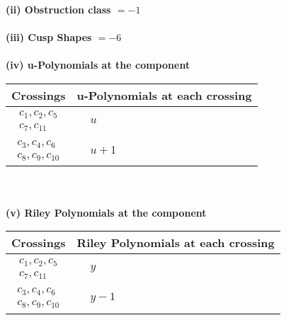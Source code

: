 \documentclass[1p]{elsarticle_modified}
\theoremstyle{definition}
\begin{document}
\flushleft \textbf{(ii) Obstruction class $= -1$}\\~\\
\flushleft \textbf{(iii) Cusp Shapes $= -6$}\\~\\
\newpage\renewcommand{\arraystretch}{1}
\flushleft \textbf{(iv) u-Polynomials at the component}\newline \\
\begin{tabular}{m{50pt}|m{274pt}}
Crossings & \hspace{64pt}u-Polynomials at each crossing \\
\hline $$\begin{aligned}c_{1},c_{2},c_{5}\\c_{7},c_{11}\end{aligned}$$&$\begin{aligned}
&u
\end{aligned}$\\
\hline $$\begin{aligned}c_{3},c_{4},c_{6}\\c_{8},c_{9},c_{10}\end{aligned}$$&$\begin{aligned}
&u+1
\end{aligned}$\\
\hline
\end{tabular}\\~\\
\newpage\renewcommand{\arraystretch}{1}
\flushleft \textbf{(v) Riley Polynomials at the component}\newline \\
\begin{tabular}{m{50pt}|m{274pt}}
Crossings & \hspace{64pt}Riley Polynomials at each crossing \\
\hline $$\begin{aligned}c_{1},c_{2},c_{5}\\c_{7},c_{11}\end{aligned}$$&$\begin{aligned}
&y
\end{aligned}$\\
\hline $$\begin{aligned}c_{3},c_{4},c_{6}\\c_{8},c_{9},c_{10}\end{aligned}$$&$\begin{aligned}
&y-1
\end{aligned}$\\
\hline
\end{tabular}\\~\\
\end{document}

